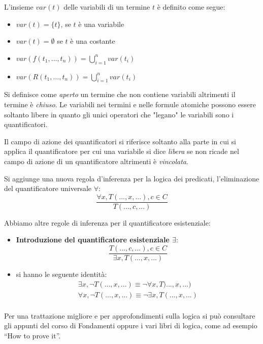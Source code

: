 \begin{defi}
    L'insieme $var(t)$ delle variabili di un termine $t$ è definito come segue:
    \begin{itemize}
        \item $var(t) = \{t \}$, se $t$ è una variabile
        \item $var(t) = \emptyset$ se $t$ è una costante
        \item $var(f(t_1,\dots,t_n)) = \bigcup _{i = 1} ^n var(t_i)$
        \item $var(R(t_1,\dots,t_n)) = \bigcup _{i = 1} ^ n var(t_i)$
    \end{itemize}
\end{defi}
Si definisce come \emph{aperto} un termine che non contiene variabili altrimenti il termine è \emph{chiuso}.\newline
Le variabili nei termini e nelle formule atomiche possono essere soltanto libere
in quanto gli unici operatori che "legano" le variabili sono i quantificatori.

Il campo di azione dei quantificatori si riferisce soltanto alla parte in cui si applica il quantificatore per cui
una variabile si dice \emph{libera} se non ricade nel campo di azione di un quantificatore altrimenti è \emph{vincolata}.

Si aggiunge una nuova regola d'inferenza per la logica dei predicati, l'eliminazione del quantificatore universale $\forall$:
\begin{equation*}
  \frac{\forall x, T(...,x,...), c\in C}{T(...,c,...)}
\end{equation*}

Abbiamo altre regole di inferenza per il quantificatore esistenziale:
\begin{itemize}
\item \textbf{Introduzione del quantificatore esistenziale $\exists$}:
  \begin{equation*}
    \frac{T(...,c,...), c\in C}{\exists x, T(...,x,...)}
  \end{equation*}
\item si hanno le seguente identità:
  \begin{equation*}
    \begin{split}
      \exists x, \neg T(...,x,...)\equiv \neg\forall x, T)...,x,...) \\
      \forall x, \neg T(...,x,...)\equiv \neg\exists x, T(...,x,...)\\
    \end{split}
  \end{equation*}
\end{itemize}
Per una trattazione migliore e per approfondimenti sulla logica si può consultare gli appunti del corso di Fondamenti oppure i vari libri di
logica, come ad esempio ``How to prove it''.
